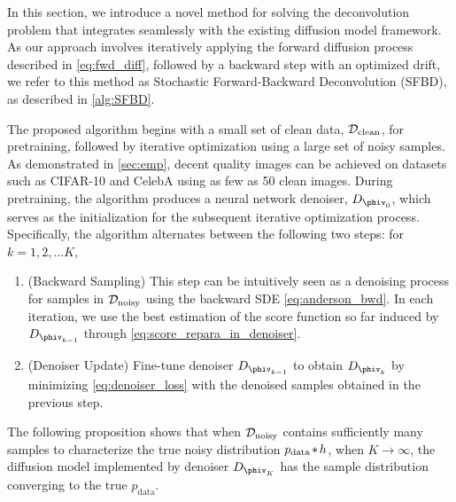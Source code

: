 In this section, we introduce a novel method for solving the deconvolution problem that integrates seamlessly with the existing diffusion model framework. As our approach involves iteratively applying the forward diffusion process described in \cref{eq:fwd_diff}, followed by a backward step with an optimized drift, we refer to this method as Stochastic Forward-Backward Deconvolution (SFBD), as described in \cref{alg:SFBD}. 

The proposed algorithm begins with a small set of clean data, $\mathcal{D}_\text{clean}$, for pretraining, followed by iterative optimization using a large set of noisy samples. As demonstrated in \cref{sec:emp}, decent quality images can be achieved on datasets such as CIFAR-10 \citep{Krizhevsky2009} and CelebA \citep{LiuLWT2015} using as few as 50 clean images. During pretraining, the algorithm produces a neural network denoiser, $D_{{\phiv}_0}$, which serves as the initialization for the subsequent iterative optimization process. Specifically, the algorithm alternates between the following two steps: for $k = 1, 2, \ldots K$, 
\begin{enumerate}
	\item (Backward Sampling) This step can be intuitively seen as a denoising process for samples in $\mathcal{D}_\text{noisy}$ using the backward SDE \cref{eq:anderson_bwd}. In each iteration, we use the best estimation of the score function so far induced by $D_{{\phiv}_{k-1}}$ through \cref{eq:score_repara_in_denoiser}. 
	\item (Denoiser Update) Fine-tune denoiser $D_{{\phiv}_{k-1}}$ to obtain $D_{{\phiv}_k}$ by minimizing \cref{eq:denoiser_loss} with the denoised samples obtained in the previous step. 
\end{enumerate}
The following proposition shows that when $\mathcal{D}_\text{noisy}$ contains sufficiently many samples to characterize the true noisy distribution $p_{\rm data} \hspace{-0.1em}*\hspace{-0.1em} h$, when $K \rightarrow \infty$, the diffusion model implemented by denoiser $D_{{\phiv}_K}$ has the sample distribution converging to the true $p_\text{data}$. 

